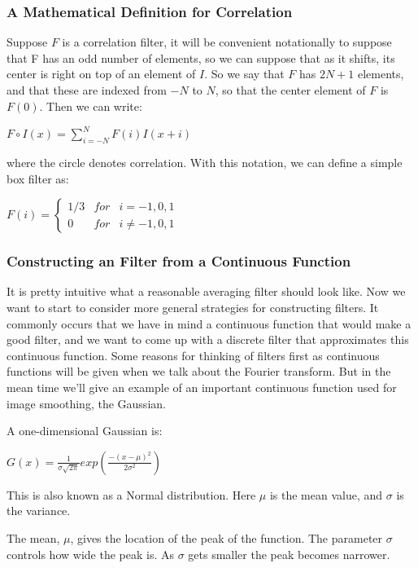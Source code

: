 \documentclass{report}
\begin{document}
\subsubsection{A Mathematical Definition for Correlation}
Suppose $F$ is a correlation filter, it will be convenient notationally to suppose that F has an odd number of elements, so we can suppose that as it shifts, its center is right on top of an element of $I$. So we say that $F$ has $2N+1$ elements, and that these are indexed from $-N$ to $N$, so that the center element of $F$ is $F(0)$. Then we can write:\newline\newline
    \centerline{$F \circ I(x) = \sum_{i=-N}^N F(i)I(x+i)$}\newline\newline
where the circle denotes correlation. With this notation, we can define a simple box filter as:\newline\newline
    \centerline{$F(i) = \left\{\begin{matrix}
1/3 & for & i = -1,0,1 \\ 
0 & for & i \neq -1,0,1
\end{matrix}\right.$}

\subsubsection{Constructing an Filter from a Continuous Function}
It is pretty intuitive what a reasonable averaging filter should look like. Now we want to start to consider more general strategies for constructing filters. It commonly occurs that we have in mind a continuous function that would make a good filter, and we want to come up with a discrete filter that approximates this continuous function. Some reasons for thinking of filters first as continuous functions will be given when we talk about the Fourier transform. But in the mean time we'll give an example of an important continuous function used for image smoothing, the Gaussian.

A one-dimensional Gaussian is:\newline
    \centerline{$G(x) = \frac{1}{\sigma \sqrt{2 \pi}} exp\left ( \frac{-(x - \mu)^2}{2\sigma^2} \right )$}\newline\newline
This is also known as a Normal distribution. Here $\mu$ is the mean value, and $\sigma$ is the variance.

The mean, $\mu$, gives the location of the peak of the function. The parameter $\sigma$ controls how wide the peak is. As $\sigma$ gets smaller the peak becomes narrower.
\end{document}
